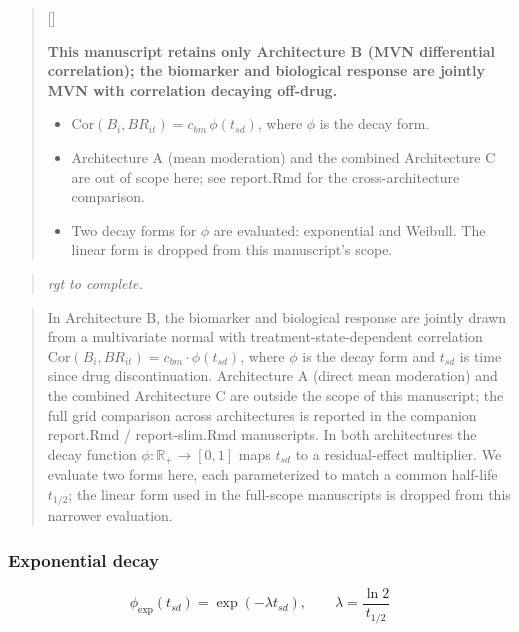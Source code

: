 \documentclass[
  11pt,
]{article}
\newcounter{pgraph}
\newenvironment{bullets}{%
  \stepcounter{pgraph}%
  \begin{quote}\small\sffamily\color[gray]{0.30}%
  {\normalfont\scriptsize\color[gray]{0.58}[\thepgraph]\enspace}}{%
  \end{quote}}
\newenvironment{rgt}{%
  \begin{quote}\small\itshape\color[RGB]{20,60,160}}{%
  \end{quote}}
\newenvironment{orig}{%
  \begin{quote}\normalsize\color[gray]{0.55}}{%
  \end{quote}}
\begin{document}
\begin{bullets}

\textbf{This manuscript retains only Architecture B (MVN differential
correlation); the biomarker and biological response are jointly MVN
with correlation decaying off-drug.}

\begin{itemize}\setlength{\itemsep}{2pt}\setlength{\parskip}{0pt}
\item $\text{Cor}(B_i, BR_{it}) = c_{bm}\,\phi(t_{sd})$, where $\phi$
is the decay form.
\item Architecture A (mean moderation) and the combined Architecture
C are out of scope here; see report.Rmd for the cross-architecture
comparison.
\item Two decay forms for $\phi$ are evaluated: exponential and
Weibull. The linear form is dropped from this manuscript's scope.
\end{itemize}

\end{bullets}

\begin{rgt}
rgt to complete.

\end{rgt}

\begin{orig}
In Architecture B, the biomarker and biological response are jointly
drawn from a multivariate normal with treatment-state-dependent
correlation
\(\text{Cor}(B_i, BR_{it}) = c_{bm} \cdot \phi(t_{sd})\), where \(\phi\)
is the decay form and \(t_{sd}\) is time since drug discontinuation.
Architecture A (direct mean moderation) and the combined Architecture
C are outside the scope of this manuscript; the full grid comparison
across architectures is reported in the companion report.Rmd /
report-slim.Rmd manuscripts. In both architectures the decay function
\(\phi : \mathbb{R}_+ \to [0, 1]\) maps \(t_{sd}\) to a residual-effect
multiplier. We evaluate two forms here, each parameterized to match
a common half-life \(t_{1/2}\); the linear form used in the full-scope
manuscripts is dropped from this narrower evaluation.

\end{orig}

\subsubsection{Exponential decay}\label{exponential-decay}

\[
\phi_{\text{exp}}(t_{sd}) =
  \exp\left(-\lambda t_{sd}\right), \qquad
  \lambda = \frac{\ln 2}{t_{1/2}}
\]
\end{document}
